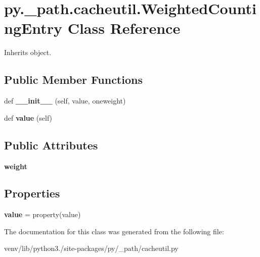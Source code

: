 \hypertarget{classpy_1_1__path_1_1cacheutil_1_1_weighted_counting_entry}{}\section{py.\+\_\+path.\+cacheutil.\+Weighted\+Counting\+Entry Class Reference}
\label{classpy_1_1__path_1_1cacheutil_1_1_weighted_counting_entry}


Inherits object.

\subsection*{Public Member Functions}
\begin{DoxyCompactItemize}
\item 
\mbox{\label{classpy_1_1__path_1_1cacheutil_1_1_weighted_counting_entry_a9607e09c795e85ed86f832a25768eb37}} 
def {\bfseries \+\_\+\+\_\+init\+\_\+\+\_\+} (self, value, oneweight)
\item 
\mbox{\label{classpy_1_1__path_1_1cacheutil_1_1_weighted_counting_entry_a9391c847e8845cb21009824f6fbaeb62}} 
def {\bfseries value} (self)
\end{DoxyCompactItemize}
\subsection*{Public Attributes}
\begin{DoxyCompactItemize}
\item 
\mbox{\label{classpy_1_1__path_1_1cacheutil_1_1_weighted_counting_entry_aba25e97d26f48274268b3bbf5a7da52e}} 
{\bfseries weight}
\end{DoxyCompactItemize}
\subsection*{Properties}
\begin{DoxyCompactItemize}
\item 
\mbox{\label{classpy_1_1__path_1_1cacheutil_1_1_weighted_counting_entry_aeac6c8b0e735600805d5dc0e30162b1f}} 
{\bfseries value} = property(value)
\end{DoxyCompactItemize}


The documentation for this class was generated from the following file\+:\begin{DoxyCompactItemize}
\item 
venv/lib/python3./site-\/packages/py/\+\_\+path/cacheutil.\+py\end{DoxyCompactItemize}
